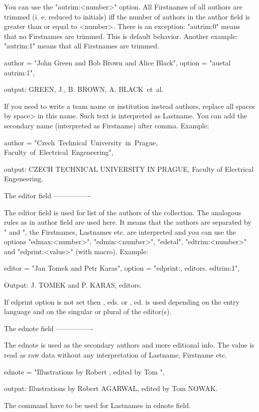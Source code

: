 You can use the "autrim:<number>" option. All Firstnames of all authors
are trimmed (i. e. reduced to initials) iff the number of authors in the 
author field is greater than or equal to <number>. There is an exception:
"autrim:0" means that no Firstnames are trimmed. This is default behavior.
Another example: "autrim:1" means that all Firstnames are trimmed.

   author = "John Green and Bob Brown and Alice Black",
   option = "auetal autrim:1",

output:    GREEN, J., B. BROWN, A. BLACK~et~al.

If you need to write a team name or institution instead authors, replace all
spaces by \<space> in this name. Such text is interpreted as Lastname. You
can add the secondary name (interpreted as Firstname) after comma. Example:

   author = "Czech\ Technical\ University\ in\ Prague, Faculty\ of\ Electrical\ Engeneering",

output:  CZECH TECHNICAL UNIVERSITY IN PRAGUE, Faculty of Electrical Engeneering.


The editor field
----------------

The editor field is used for list of the authors of the collection. The
analogous rules as in author field are used here. It means that the
authors are separated by " and ", the Firstnames, Lastnames etc. are
interpreted and you can use the options "edmax:<number>", "edmin:<number>", 
"edetal", "edtrim:<number>" and "edprint:<value>" (with \ED macro).
Example:

    editor = "Jan Tomek and Petr Karas",
    option = "edprint:{\ED, editors.} edtrim:1",

Output:   J. TOMEK and P. KARAS, editors.

If edprint option is not set then {\ED, eds.} or {\ED, ed.} is used
depending on the entry language and on the singular or plural of 
the editor(s).


The ednote field
----------------

The ednote is used as the secondary authors and more editional info. The
value is read as raw data without any interpretation of Lastname, Firstname
etc.

    ednote = "Illustrations by Robert , edited by Tom ",

output:   Illustrations by Robert AGARWAL, edited by Tom NOWAK.

The \upper command have to be used for Lastnames in ednote field.


